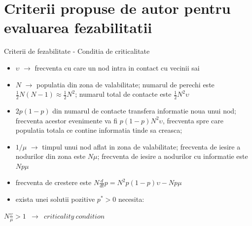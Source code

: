 \documentclass{beamer}
\begin{document}
\section[Criterii pentru evaluarea fezabilitatii] {Criterii propuse de autor
pentru evaluarea fezabilitatii}
\begin{frame}{Criterii de fezabilitate - Conditia de criticalitate}
	\begin{itemize}
	  \item $\upsilon$ $\rightarrow$ frecventa cu care un nod intra in contact cu
	  vecinii sai
	  \item $N$ $\rightarrow$ populatia din zona de valabilitate; numarul de
	  perechi este $\frac{1}{2}N(N-1) \approx \frac{1}{2}N^2$; numarul total de
	  contacte este $\frac{1}{2}N^2\upsilon$
	  \item $2p(1-p)$ din numarul de contacte transfera informatie noua unui nod;
	  frecventa acestor evenimente va fi $p(1-p)N^2\upsilon$, frecventa spre care
	  populatia totala ce contine informatia tinde sa creasca;
	  \item $1/\mu$ $\rightarrow$ timpul unui nod aflat in zona de valabilitate;
	  frecventa de iesire a nodurilor din zona este $N\mu$; frecventa de iesire a
	  nodurilor cu informatie este $Np\mu$
	  \item frecventa de crestere este $N\frac{d}{dt}p = N^2p(1-p)\upsilon - Np\mu$
	  \item exista unei solutii pozitive $p^* > 0$ necesita:
	\end{itemize}
	\hskip0.5in
	\small{
		\begin{beamerboxesrounded}[lower=block body,shadow=true,width=3.2in]{}
			\begin{center}
				\texttt{$N\frac{\upsilon}{\mu} > 1$ $\rightarrow$ $criticality\ condition$}
			\end{center}
		\end{beamerboxesrounded}
	}
\end{frame}
\end{document}
